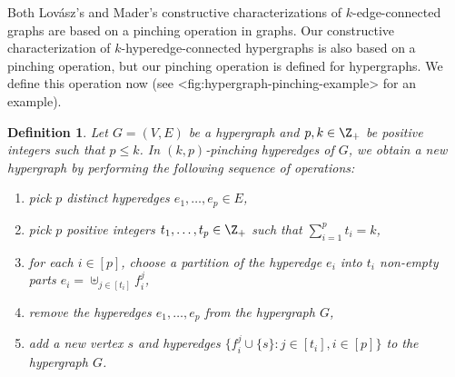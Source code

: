 \documentclass{article}
\def\Cref#1{<#1>}%
\newtheorem{definition}{Definition}[section]
\newcommand{\knote}[1]{{\color{red}[{\tiny Karthik: \bf #1}]\marginpar{\color{red}*}}}
\begin{document}
Both Lov\'{a}sz's and Mader's constructive characterizations of $k$-edge-connected graphs are based on a pinching operation in graphs. Our constructive characterization of $k$-hyperedge-connected hypergraphs is also based on a pinching operation, but our pinching operation is defined for hypergraphs. We define this operation now (see \Cref{fig:hypergraph-pinching-example} for an example). %

\begin{definition}\label{def:pinching-operation}
    Let $G = (V, E)$ be a hypergraph and $p,k \in \Z_+$ be positive integers such that $p \leq k$. In \emph{$(k, p)$-pinching} hyperedges of $G$, we obtain a new hypergraph by performing the following sequence of operations:
    \begin{enumerate}
        \item pick $p$ distinct hyperedges $e_1, \ldots, e_p \in E$,
        \item pick $p$ positive integers $t_1, \ldots, t_p \in \Z_+$ such that $\sum_{i=1}^p t_i = k$,
        \item for each $i \in [p]$, choose a partition of the hyperedge $e_i$ into $t_i$ non-empty parts $e_i = \uplus_{j \in [t_i]} f_i^j$,
        \item remove the hyperedges $e_1, \ldots, e_p$ from the hypergraph $G$,
        \item add a new vertex $s$ and hyperedges $\{f_i^j \cup \{s\} : j \in [t_i], i \in [p]\}$ to the hypergraph $G$.
    \end{enumerate}
\end{definition}
\end{document}
